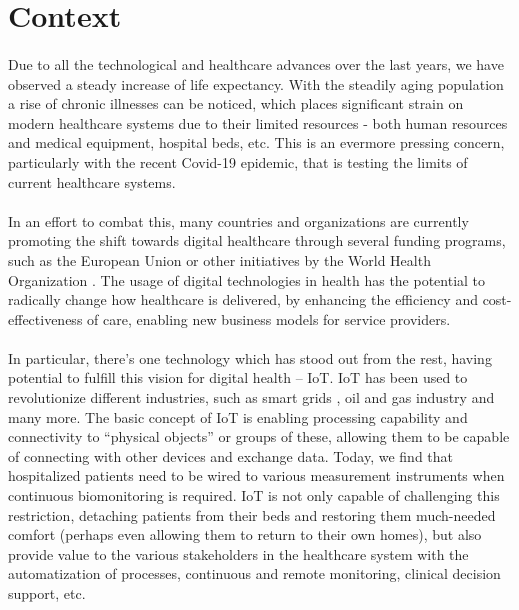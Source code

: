 

\section{Context}

\paragraph{} Due to all the technological and healthcare advances over the last years, we have observed a steady increase of life expectancy. With the steadily aging population a rise of chronic illnesses can be noticed, which places significant strain on modern healthcare systems due to their limited resources - both human resources and medical equipment, hospital beds, etc. This is an evermore pressing concern, particularly with the recent Covid-19 epidemic, that is testing the limits of current healthcare systems. 

\paragraph{} In an effort to combat this, many countries and organizations are currently promoting the shift towards digital healthcare through several funding programs, such as the European Union \cite{EuropeanUnion2021} or other initiatives by the World Health Organization \cite{WorldHealthOrganization2020}. The usage of digital technologies in health has the potential to radically change how healthcare is delivered, by enhancing the efficiency and cost-effectiveness of care, enabling new business models for service providers.

\paragraph{} In particular, there's one technology which has stood out from the rest, having potential to fulfill this vision for digital health -- \acf{IoT}. \acs{IoT} has been used to revolutionize different industries, such as smart grids \cite{Faria2020}, oil and gas industry \cite{Shoja2018} and many more. The basic concept of \acs{IoT} is enabling processing capability and connectivity to ``physical objects'' or groups of these, allowing them to be capable of connecting with other devices and exchange data. Today, we find that hospitalized patients need to be wired to various measurement instruments when continuous biomonitoring is required. \acs{IoT} is not only capable of challenging this restriction, detaching patients from their beds and restoring them much-needed comfort (perhaps even allowing them to return to their own homes), but also provide value to the various stakeholders in the healthcare system with the automatization of processes, continuous and remote monitoring, clinical decision support, etc.

